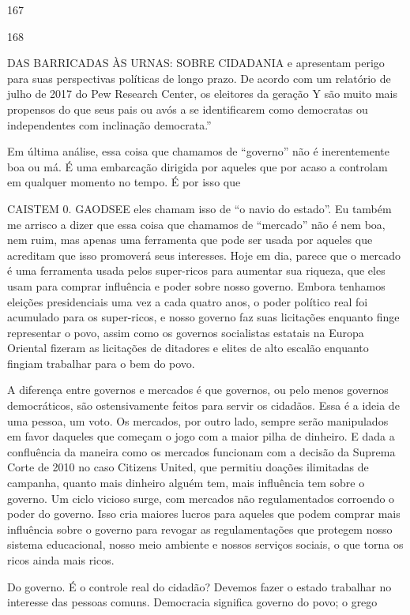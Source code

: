  \par 
167
 \par 
168
 \par 
DAS BARRICADAS ÀS URNAS: SOBRE CIDADANIA e apresentam perigo para suas perspectivas políticas de longo prazo. De acordo com um relatório de julho de 2017 do Pew Research Center, os eleitores da geração Y são muito mais propensos do que seus pais ou avós a se identificarem como democratas ou independentes com inclinação democrata.”
 \par 
Em última análise, essa coisa que chamamos de “governo” não é inerentemente boa ou má. É uma embarcação dirigida por aqueles que por acaso a controlam em qualquer momento no tempo. É por isso que
 \par 
CAISTEM {\color{blue}0}. GAODSEE eles chamam isso de “o navio do estado”. Eu também me arrisco a dizer que essa coisa que chamamos de “mercado” não é nem boa, nem ruim, mas apenas uma ferramenta que pode ser usada por aqueles que acreditam que isso promoverá seus interesses. Hoje em dia, parece que o mercado é uma ferramenta usada pelos super-ricos para aumentar sua riqueza, que eles usam para comprar influência e poder sobre nosso governo. Embora tenhamos eleições presidenciais uma vez a cada quatro anos, o poder político real foi acumulado para os super-ricos, e nosso governo faz suas licitações enquanto finge representar o povo, assim como os governos socialistas estatais na Europa Oriental fizeram as licitações de ditadores e elites de alto escalão enquanto fingiam trabalhar para o bem do povo.
 \par 
A diferença entre governos e mercados é que governos, ou pelo menos governos democráticos, são ostensivamente feitos para servir os cidadãos. Essa é a ideia de uma pessoa, um voto. Os mercados, por outro lado, sempre serão manipulados em favor daqueles que começam o jogo com a maior pilha de dinheiro. E dada a confluência da maneira como os mercados funcionam com a decisão da Suprema Corte de 2010 no caso Citizens United, que permitiu doações ilimitadas de campanha, quanto mais dinheiro alguém tem, mais influência tem sobre o governo. Um ciclo vicioso surge, com mercados não regulamentados corroendo o poder do governo. Isso cria maiores lucros para aqueles que podem comprar mais influência sobre o governo para revogar as regulamentações que protegem nosso sistema educacional, nosso meio ambiente e nossos serviços sociais, o que torna os ricos ainda mais ricos.
 \par 
Do governo. É o controle real do cidadão? Devemos fazer o estado trabalhar no interesse das pessoas comuns. Democracia significa governo do povo; o grego
